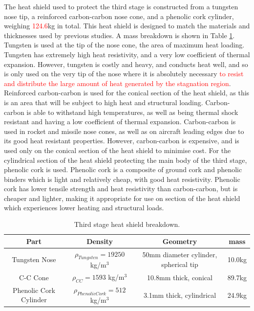 The heat shield used to protect the third stage is constructed from a tungsten nose tip, a reinforced carbon-carbon nose cone, and a phenolic cork cylinder, weighing \textcolor{red}{124.6}kg in total. This heat shield is designed to match the materials and thicknesses used by previous studies\cite{Preller2017b}. A mass breakdown is shown in Table \ref{tab:heatshield}.
Tungsten is used at the tip of the nose cone, the area of maximum heat loading. Tungsten has extremely high heat resistivity, and a very low coefficient of thermal expansion\cite{tungsten}. However, tungsten is costly and heavy, and conducts heat well, and so is only used on the very tip of the nose where it is absolutely necessary \textcolor{red}{to resist and distribute the large amount of heat generated by the stagnation region}. 
  Reinforced carbon-carbon is used for the conical section of the heat shield, as this is an area that will be subject to high heat and structural loading. Carbon-carbon is able to withstand high temperatures, as well as being thermal shock resistant and having a low coefficient of thermal expansion\cite{Fitzer}. Carbon-carbon is used in rocket and missile nose cones, as well as on aircraft leading edges due to its good heat resistant properties\cite{Fitzer}. However, carbon-carbon is expensive, and is used only on the conical section of the heat shield to minimise cost. For the cylindrical section of the heat shield protecting the main body of the third stage, phenolic cork is used. Phenolic cork is a composite of ground cork and phenolic binders which is light and relatively cheap, with good heat resistivity. Phenolic cork has lower tensile strength and heat resistivity than carbon-carbon\cite{Composites,Fitzer}, but is cheaper and lighter, making it appropriate for use on section of the heat shield which experiences lower heating and structural loads. 

		\begin{table}[h]
			\centering
\begin{tabular}{|c|c|c|c|}
	\hline  Part & Density & Geometry & mass \\ 
	\hline  Tungsten Nose & $\rho_{Tungsten} = 19250$  kg/m$^3$ & 50mm diameter cylinder, spherical tip & 10.0kg \\ 
		\hline C-C Cone & $\rho_{CC} = 1593$  kg/m$^3$ & 10.8mm thick, conical & 89.7kg \\ 
			\hline Phenolic Cork Cylinder & $\rho_{Phenolic Cork} = 512$  kg/m$^3$ & 3.1mm thick, cylindrical & 24.9kg \\ 
	\hline 
\end{tabular} 
\caption{Third stage heat shield breakdown.} %
\label{tab:heatshield}
\end{table}
		
